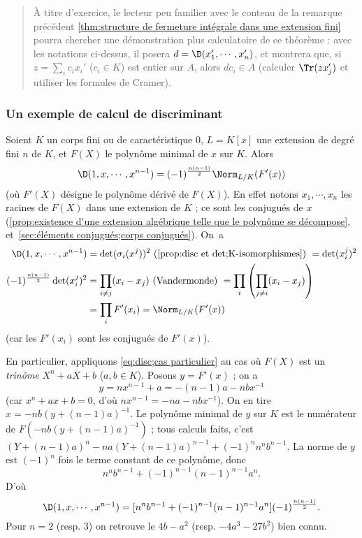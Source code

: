 \documentclass[11pt, useosf,
  title in boldface,
  theorem in new line,
  theorem numbering = section,
  number theorems separately,
]{simplivre}
\begin{document}
    \begin{quote}
        À titre d'exercice, le lecteur peu familier avec le contenu de la remarque précédent \cref{thm:structure de fermeture intégrale dans une extension fini} pourra chercher une démonstration plus calculatoire de ce théorème : avec les notations ci-dessus, il posera \( d = \D(x_1', \cdots, x_n') \), et montrera que, si \( z = \sum_i c_i x_i' \) (\( c_i \in K \)) est entier sur \( A \), alors \( d c_i \in A \) (calculer \( \Tr(z x_j') \) et utiliser les formules de Cramer).
    \end{quote}

\subsubsection*{Un exemple de calcul de discriminant}
    Soient \( K \) un corps fini ou de caractéristique \( 0 \), \( L = K[x] \) une extension de degré fini \( n \) de \( K \), et \( F(X) \) le polynôme minimal de \( x \) sur \( K \). Alors
    \begin{equation}\label{eq:disc;cas particulier}
        \D(1, x, \cdots, x^{n-1}) = (-1)^{\frac{n(n-1)}{2}} \Norm_{L/K}(F'(x))
    \end{equation}
    (où \( F'(X) \) désigne le polynôme dérivé de \( F(X) \)). En effet notons \( x_1, \cdots, x_n \) les racines de \( F(X) \) dans une extension de \( K \) ; ce sont les conjugués de \( x \) (\cref{prop:existence d'une extension algébrique telle que le polynôme se décompose}, et~\cref{sec:éléments conjugués;corps conjugués}). On~a
    \begin{align*}
        \D(1, x, \cdots, x^{n-1}) &= \det(\sigma_i(x^j))^2 \text{ (\cref{prop:disc et det;K-isomorphismes}) } = \det(x_i^j)^2\\
        (-1)^{\frac{n(n-1)}{2}} \det(x_i^j)^2 &= \prod_{i \neq j} (x_i - x_j) \text{ (Vandermonde) } = \prod_i\left(\prod_{j \neq i} (x_i - x_j)\right)\\
        &= \prod_i F'(x_i) = \Norm_{L/K}(F'(x))
    \end{align*}
    (car les \( F'(x_i) \) sont les conjugués de \( F'(x) \)).

    En particulier, appliquons \eqref{eq:disc;cas particulier} au cas où \( F(X) \) est un \emph{trinôme} \( X^n + aX + b \) (\( a,b \in K \)). Posons \( y = F'(x) \) ; on a
    \[
        y = n x^{n-1} + a = -(n-1)a - n b x^{-1}
    \]
    (car \( x^n + ax + b = 0 \), d'où \( n x^{n-1} = -n a - n b x^{-1} \)). On en tire \( x = -nb(y+(n-1)a)^{-1} \). Le polynôme minimal de \( y \) sur \( K \) est le numérateur de \( F(-nb(y+(n-1)a)^{-1}) \) ; tous calculs faits, c'est \( (Y+(n-1)a)^n - na(Y+(n-1)a)^{n-1} + (-1)^n n^n b^{n-1} \). La norme de \( y \) est \( (-1)^n \) fois le terme constant de ce polynôme, donc
    \[
        n^n b^{n-1} + (-1)^{n-1} (n-1)^{n-1} a^n.
    \]
    D'où
    \begin{equation}\label{disc;cas particulier de cas particulier}
        \D(1, x, \cdots, x^{n-1}) = [n^n b^{n-1} + (-1)^{n-1} (n-1)^{n-1} a^n] (-1)^{\frac{n(n-1)}{2}}.
    \end{equation}
    Pour \( n = 2 \) (resp. \( 3 \)) on retrouve le \( 4b-a^2 \) (resp. \( -4a^3-27b^2 \)) bien connu.
\end{document}
